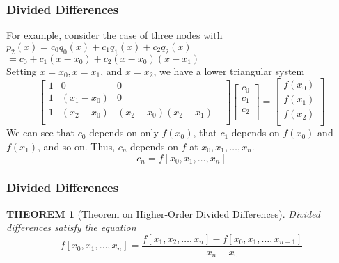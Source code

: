\documentclass[notheorems,mathserif,table,compress]{beamer}  %
\begin{document}
\begin{frame}
  \frametitle{Divided Differences}
  For example, consider the case of three nodes with\\
  \qquad $p_2(x)=c_0q_0(x)+c_1q_1(x)+c_2q_2(x)$\\
  \qquad \qquad $=c_0+c_1(x-x_0)+c_2(x-x_0)(x-x_1)$\\
  Setting $x=x_0,x=x_1$, and $x=x_2$, we have a lower triangular system\\
  \begin{displaymath}
  \begin{bmatrix}
  1 &     0     &          0         & \\
  1 & (x_1-x_0) &          0         & \\
  1 & (x_2-x_0) & (x_2-x_0)(x_2-x_1) & \\
  \end{bmatrix}
  \begin{bmatrix}
  c_0\\
  c_1\\
  c_2\\
  \end{bmatrix}
  =\begin{bmatrix}
  f(x_0)\\
  f(x_1)\\
  f(x_2)\\
  \end{bmatrix}
  \end{displaymath}
  We can see that $c_0$ depends on only $f(x_0)$, that $c_1$ depends on $f(x_0)$ and $f(x_1)$, and so on. Thus, $c_n$ depends on $f$ at $x_0,x_1,\ldots,x_n$.
  \[ c_n=f[x_0,x_1,\ldots,x_n] \]
\end{frame}


\begin{frame}
  \frametitle{Divided Differences}
  \newtheorem{theorem 2}[theorem 1]{THEOREM}
  \begin{theorem 2}[Theorem on Higher-Order Divided Differences]
  Divided differences satisfy the equation
  \begin{displaymath}
  f[x_0,x_1,\ldots,x_n]=\frac{f[x_1,x_2,\ldots,x_n]-f[x_0,x_1,\ldots,x_{n-1}]}{x_n-x_0}
  \end{displaymath}
  \end{theorem 2}
\end{frame}
\end{document}

